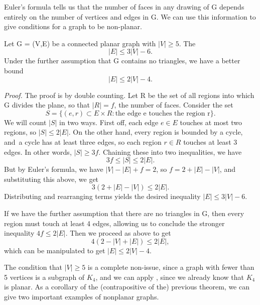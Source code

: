 \documentclass{tufte-handout}
\begin{document}
Euler's formula tells us that the number of faces in any drawing of G depends entirely on
the number of vertices and edges in G. We can use this information to give conditions for a graph to be non-planar.

\begin{Theorem}
    \label{thm:nonplanar_bound}
    Let G = (V,E) be a connected planar graph with \( \left|V\right| \geq 5 \). The
    \[\left|E\right| \leq 3\left|V\right| - 6.\]
    Under the further assumption that G contains no triangles, we have a better bound
    \[\left|E\right| \leq 2\left|V\right| - 4.\]
\end{Theorem}

\textit{Proof.} The proof is by double counting. Let R be the set
of all regions into which G divides the plane, so that \( \left|R\right| =f\),
the number of faces. Consider the set
\[S = \{(e,r) \subset E \times R: \text{the edge e touches the region r}\}.\]
We will count \( \left|S\right| \) in two ways. First off, each edge \( e\in E \) touches
at most two regions, so \( \left|S\right| \leq 2\left|E\right| \).
On the other hand, every region is bounded by a cycle, and\
a cycle has at least three edges, so each region \( r \in R \) touches
at least 3 edges. In other words, \( \left|S\right| \geq 3f \).
Chaining these into two inequalities, we have
\[3f \leq \left|S\right| \leq 2\left|E\right|.\]
But by Euler's formula, we have \( \left|V\right| - \left|E\right| + f = 2 \), so
\(f = 2 + \left|E\right| - \left|V\right|\), and substituting this
above, we get
\[3(2 + \left|E\right| - \left|V\right|) \leq 2\left|E\right|.\]
Distributing and rearranging terms yields the desired
inequality \( \left|E\right| \leq 3\left|V\right| - 6 \).

If we have the further assumption that there are no triangles in G,
then every region must touch at least 4 edges, allowing us
to conclude the stronger inequality \( 4f \leq 2 \left|E\right| \).
Then we proceed as above to get
\[ 4(2 - \left|V\right| + \left|E\right|) \leq 2\left|E\right|,\]
which can be manipulated to get
\( \left|E\right| \leq 2\left|V\right| - 4 \). \qedsymbol

The condition that \( \left|V\right| \geq 5 \) is a complete non-issue, since a graph with
fewer than 5 vertices is a subgraph of \( K_4 \), and we can apply ,
since we already know that \( K_4 \) is planar. As a corollary of the (contrapositive of the) 
previous theorem, we can give two important examples of nonplanar graphs.
\end{document}
